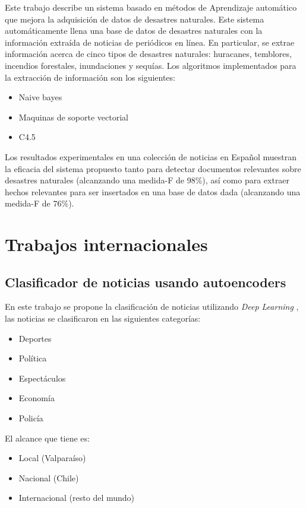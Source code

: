Este trabajo describe un sistema basado en métodos de Aprendizaje automático que mejora la adquisición de datos de desastres naturales\citep{CD11}. Este sistema automáticamente llena una base de datos de desastres naturales con la información extraída de noticias de periódicos en línea. En particular, se extrae información acerca de cinco tipos de desastres naturales: huracanes, temblores, incendios forestales, inundaciones y sequías. Los algoritmos implementados para la extracción de información son los siguientes: 

\begin{itemize}
	\item Naive bayes
	\item Maquinas de soporte vectorial
	\item C4.5
\end{itemize} 

Los resultados experimentales en una colección de noticias en Español muestran la eficacia del sistema propuesto tanto para detectar documentos relevantes sobre desastres naturales (alcanzando una medida-F de 98\%), así como para extraer hechos relevantes para ser insertados en una base de datos dada (alcanzando una medida-F de 76\%).


\section[Trabajos I]{Trabajos internacionales}

\begin{large}
	 \subsection{Clasificador de noticias usando autoencoders}
\end{large}

En este trabajo se propone la clasificación de noticias utilizando \textit{Deep Learning} \citep{CD3}, las noticias se clasificaron en las siguientes categorías:

\begin{itemize}
	\item Deportes
	\item Política
	\item Espectáculos
	\item Economía
	\item Policía
\end{itemize}
El alcance que tiene es:
\begin{itemize}
	\item Local (Valparaíso)
	\item Nacional (Chile)
	\item Internacional (resto del mundo)
\end{itemize}


